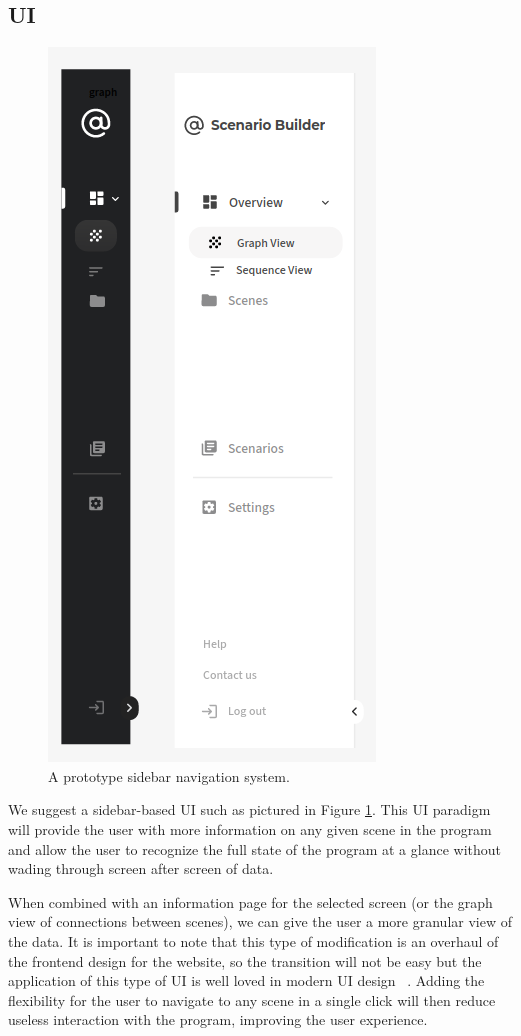 \documentclass[sigart]{acmart_mod} %
\begin{document}
\subsection{UI}
\begin{figure}
  \begin{center}
  \includegraphics[scale=0.4, angle=270]{media/sidebar.png}
  \end{center}
\caption{A prototype sidebar navigation system.}\label{fig1}
\end{figure}
We suggest a sidebar-based UI such as pictured in Figure \ref{fig1}. This UI paradigm will provide the user with more information on any given scene in the program and allow the user to recognize the full state of the program at a glance without wading through screen after screen of data.

When combined with an information page for the selected screen (or the graph view of connections between scenes), we can give the user a more granular view of the data. It is important to note that this type of modification is an overhaul of the frontend design for the website, so the transition will not be easy but the application of this type of UI is well loved in modern UI design~\cite{YourConnectedWorkspace} \cite{SupabaseOpenSource} \cite{FlutterBuildApps}. Adding the flexibility for the user to navigate to any scene in a single click will then reduce useless interaction with the program, improving the user experience.
\end{document}

